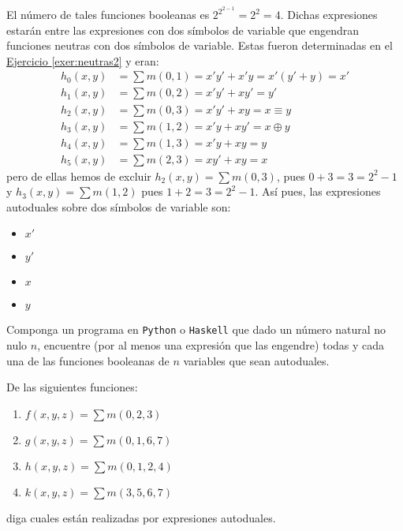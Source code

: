 \begin{solution}
  El número de tales funciones booleanas es
  $2^{2^{2-1}}=2^{2}=4$. Dichas expresiones estarán entre las
  expresiones con dos símbolos de variable que engendran funciones neutras
  con dos símbolos de variable. Estas fueron determinadas en el
  \hyperref[exer:neutras2]{Ejercicio \ref*{exer:neutras2}} y eran: 
  \begin{align*}
    h_{0}(x,y)&=\sum m(0,1)=x'y'+x'y=x'(y'+y)=x'\\
    h_{1}(x,y)&=\sum m(0,2)=x'y'+xy'=y'\\
    h_{2}(x,y)&=\sum m(0,3)=x'y'+xy=x\equiv y\\
    h_{3}(x,y)&=\sum m(1,2)=x'y+xy'=x\oplus y\\
    h_{4}(x,y)&=\sum m(1,3)=x'y+xy=y\\
    h_{5}(x,y)&=\sum m(2,3)=xy'+xy=x
  \end{align*}
  pero de ellas hemos de excluir $h_{2}(x,y)=\sum m(0,3)$, pues
  $0+3=3=2^{2}-1$ y $h_{3}(x,y)=\sum m(1,2)$ pues $1+2=3=2^{2}-1$. Así
  pues, las expresiones autoduales sobre dos símbolos de variable son:
  \begin{itemize}
  \item $x'$
  \item $y'$
  \item $x$
  \item $y$
  \end{itemize}
\end{solution}

\begin{exercise}
  Componga un programa en \texttt{Python} o \texttt{Haskell} que dado
  un número natural no nulo $n$, encuentre (por al menos una expresión
  que las engendre) todas y cada una de las funciones booleanas de $n$
  variables que sean autoduales.
\end{exercise}

\begin{exercise}
  De las siguientes funciones:
  \begin{enumerate}
  \item $f(x,y,z)=\sum m(0,2,3)$\\
  \item $g(x,y,z)=\sum m(0,1,6,7)$\\
  \item $h(x,y,z)=\sum m(0,1,2,4)$\\
  \item $k(x,y,z)=\sum m(3,5,6,7)$\\
  \end{enumerate}
  diga cuales están realizadas por expresiones autoduales.
\end{exercise}

